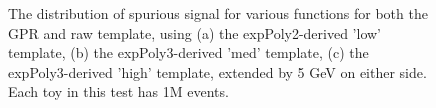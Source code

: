 \begin{figure} 
\begin{center}

\caption{The distribution of spurious signal for various functions for both the GPR and raw template, using (a) the expPoly2-derived 'low' template, (b) the expPoly3-derived 'med' template, (c) the expPoly3-derived 'high' template, extended by 5 GeV on either side. Each toy in this test has 1M events.}
\label{fig:padded_lowpt_1M_noSig}
\end{center}
\end{figure}

